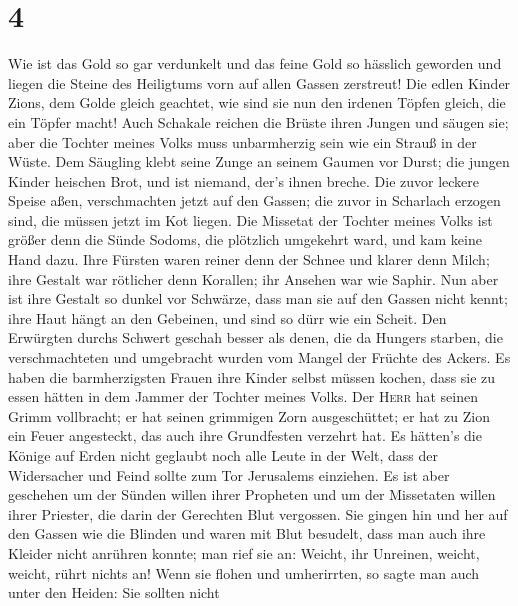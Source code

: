 \hypertarget{section-3}{%
\section{4}\label{section-3}}

 Wie ist das Gold so gar verdunkelt und das feine Gold so
hässlich geworden und liegen die Steine des Heiligtums vorn auf allen
Gassen zerstreut!  Die edlen Kinder Zions, dem Golde
gleich geachtet, wie sind sie nun den irdenen Töpfen gleich, die ein
Töpfer macht!  Auch Schakale reichen die Brüste ihren
Jungen und säugen sie; aber die Tochter meines Volks muss unbarmherzig
sein wie ein Strauß in der Wüste.  Dem Säugling klebt
seine Zunge an seinem Gaumen vor Durst; die jungen Kinder heischen Brot,
und ist niemand, der's ihnen breche.  Die zuvor leckere
Speise aßen, verschmachten jetzt auf den Gassen; die zuvor in Scharlach
erzogen sind, die müssen jetzt im Kot liegen.  Die
Missetat der Tochter meines Volks ist größer denn die Sünde Sodoms, die
plötzlich umgekehrt ward, und kam keine Hand dazu.  Ihre
Fürsten waren reiner denn der Schnee und klarer denn Milch; ihre Gestalt
war rötlicher denn Korallen; ihr Ansehen war wie Saphir. 
Nun aber ist ihre Gestalt so dunkel vor Schwärze, dass man sie auf den
Gassen nicht kennt; ihre Haut hängt an den Gebeinen, und sind so dürr
wie ein Scheit.  Den Erwürgten durchs Schwert geschah
besser als denen, die da Hungers starben, die verschmachteten und
umgebracht wurden vom Mangel der Früchte des Ackers.  Es
haben die barmherzigsten Frauen ihre Kinder selbst müssen kochen, dass
sie zu essen hätten in dem Jammer der Tochter meines Volks.
 Der \textsc{Herr} hat seinen Grimm vollbracht; er hat
seinen grimmigen Zorn ausgeschüttet; er hat zu Zion ein Feuer
angesteckt, das auch ihre Grundfesten verzehrt hat.  Es
hätten's die Könige auf Erden nicht geglaubt noch alle Leute in der
Welt, dass der Widersacher und Feind sollte zum Tor Jerusalems
einziehen.  Es ist aber geschehen um der Sünden willen
ihrer Propheten und um der Missetaten willen ihrer Priester, die darin
der Gerechten Blut vergossen.  Sie gingen hin und her auf
den Gassen wie die Blinden und waren mit Blut besudelt, dass man auch
ihre Kleider nicht anrühren konnte;  man rief sie an:
Weicht, ihr Unreinen, weicht, weicht, rührt nichts an! Wenn sie flohen
und umherirrten, so sagte man auch unter den Heiden: Sie sollten nicht

